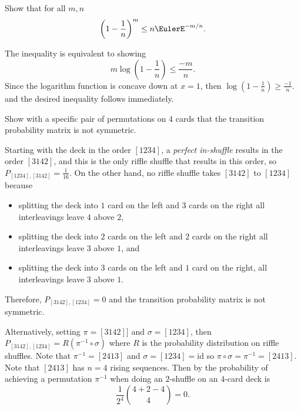 \documentclass[12pt]{article}
\begin{document}
  \begin{exercise}
    Show that for all \(m,n\)
    \[
      \left( 1 - \frac{1}{n} \right)^m \le n \EulerE^{-m/n}.
    \]
    \end{exercise}
    \begin{solution}
      The inequality is equivalent to showing
      \[
        m \log(1-\frac{1}{n}) \le \frac{-m}{n}.
      \]
      Since the logarithm function is concave down at \(x=1\), then
      \( \log(1- \frac{1}{n}) \ge \frac{-1}{n} \). 
      and the desired inequality follows immediately.
    \end{solution}

\begin{exercise}
    Show with a specific pair of permutations on \( 4 \) cards that the
    transition probability matrix is not symmetric.
\end{exercise}
\begin{solution}
    Starting with the deck in the order \( [1234] \), a \emph{perfect
    in-shuffle} results in the order \( [3142] \), and this is the only
    riffle shuffle that results in this order, so \( P_{[1234],[3142]} =
    \frac{1}{16} \).  On the other hand, no riffle shuffle takes \( [3142]
    \) to \( [1234] \) because
    \begin{itemize}
        \item
            splitting the deck into \( 1 \) card on the left and \( 3 \)
            cards on the right all interleavings leave \( 4 \) above \(
            2 \),
        \item
            splitting the deck into \( 2 \) cards on the left and \( 2 \)
            cards on the right all interleavings leave \( 3 \) above \(
            1 \), and
        \item
            splitting the deck into \( 3 \) cards on the left and \( 1 \)
            card on the right, all interleavings leave \( 3 \) above \(
            1 \).
    \end{itemize}
    Therefore, \( P_{[3142],[1234]} = 0 \) and the transition
    probability matrix is not symmetric.

    Alternatively, setting \( \pi = [3142]] \) and \( \sigma = [1234]
    \), then \( P_{[3142],[1234]} = R( \pi^{-1} \circ \sigma ) \)
    where \( R \) is the probability distribution on riffle shuffles.
    Note that \( \pi^{-1} = [2413] \) and \( \sigma = [1234] =
    \text{id} \) so \( \pi \circ \sigma = \pi^{-1} = [2413] \).  Note
    that \( [2413] \) has \( n=4 \) rising sequences.  Then by the
    probability of achieving a permutation \( \pi^{-1} \) when doing an \(
    2 \)-shuffle on an \( 4 \)-card deck is
    \[
      \frac{1}{2^4} \binom{4 + 2 - 4}{4} = 0.
    \]
\end{solution}
\end{document}
